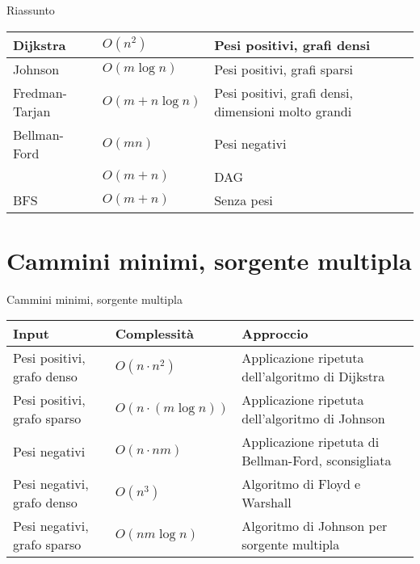 \begin{frame}{Riassunto}

\vspace{-9pt}

\medskip
\begingroup
\renewcommand*{\arraystretch}{1.2}
\begin{tabular}{|l|l|P{5cm}|}
\hline
Dijkstra & $O(n^2)$ & Pesi positivi, grafi densi \\\hline
Johnson & $O(m \log n)$ & Pesi positivi, grafi sparsi \\\hline
Fredman-Tarjan & $O(m + n \log n)$ & Pesi positivi, grafi densi, dimensioni molto grandi  \\\hline
Bellman-Ford & $O(mn)$ & Pesi negativi \\\hline
  & $O(m+n)$ & DAG \\\hline
BFS & $O(m+n)$ & Senza pesi \\\hline
\end{tabular}
\endgroup

\end{frame}


\section{Cammini minimi, sorgente multipla}

\vspace{-9pt}
\begin{frame}{Cammini minimi, sorgente multipla}


\medskip
\begingroup
\renewcommand*{\arraystretch}{1.2}
\small
\begin{tabular}{|P{2.3cm}|P{2.6cm}|P{5.8cm}|}
\hline
\textbf{Input} & \textbf{Complessità} & \textbf{Approccio} \\\hline
Pesi positivi, grafo denso & $O(n \cdot n^2)$ & Applicazione ripetuta dell'algoritmo di Dijkstra \\\hline
Pesi positivi, grafo sparso & $O(n \cdot (m \log n))$ & Applicazione ripetuta dell'algoritmo di Johnson \\\hline
Pesi negativi & $O(n \cdot nm)$ & Applicazione ripetuta di Bellman-Ford, \alert{sconsigliata} \\\hline
Pesi negativi, grafo denso & $O(n^3)$ & Algoritmo di \alert{Floyd e Warshall} \\\hline
Pesi negativi, grafo sparso & $O(nm \log n)$ & Algoritmo di \alert{Johnson per sorgente multipla} \\\hline
\end{tabular}
\endgroup

\end{frame}

